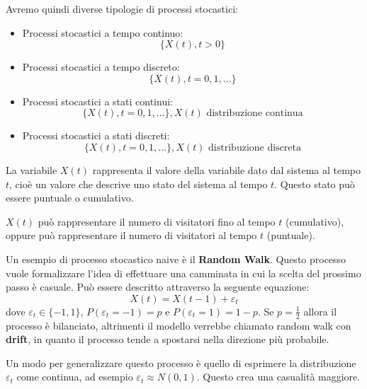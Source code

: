 Avremo quindi diverse tipologie di processi stocastici:
\begin{itemize}
    \item Processi stocastici a tempo continuo:
          \begin{equation*}
              \{X(t), t>0\}
          \end{equation*}
    \item Processi stocastici a tempo discreto:
          \begin{equation*}
              \{X(t), t=0,1,\dots\}
          \end{equation*}
    \item Processi stocastici a stati continui:
          \begin{equation*}
              \{X(t), t=0,1,\dots\}, X(t) \text{ distribuzione continua}
          \end{equation*}
    \item Processi stocastici a stati discreti:
          \begin{equation*}
              \{X(t), t=0,1,\dots\}, X(t) \text{ distribuzione discreta}
          \end{equation*}
\end{itemize}
La variabile $X(t)$ rappresenta il valore della variabile dato dal sistema al
tempo $t$, cioè un valore che descrive uno stato del sistema al tempo $t$. Questo
stato può essere puntuale o cumulativo.
\begin{esempio}
    $X(t)$ può rappresentare il numero di visitatori fino al tempo $t$ (cumulativo),
    oppure può rappresentare il numero di visitatori al tempo $t$ (puntuale).
\end{esempio}
Un esempio di processo stocastico naive è il \textbf{Random Walk}. Questo processo
vuole formalizzare l'idea di effettuare una camminata in cui la scelta del prossimo
passo è casuale. Può essere descritto attraverso la seguente equazione:
\begin{equation*}
    X(t) = X(t-1) + \varepsilon_t
\end{equation*}
dove $\varepsilon_t \in \{-1, 1\}$,  $P(\varepsilon_t = -1) = p$ e $P(\varepsilon_t = 1) = 1- p$.
Se $p=\frac{1}{2}$ allora il processo è bilanciato, altrimenti il modello verrebbe
chiamato random walk con \textbf{drift}, in quanto il processo tende a spostarsi
nella direzione più probabile.

Un modo per generalizzare questo processo è quello di esprimere la distribuzione
$\varepsilon_t$ come continua, ad esempio $\varepsilon_t \approx N(0, 1)$. Questo
crea una casualità maggiore.

